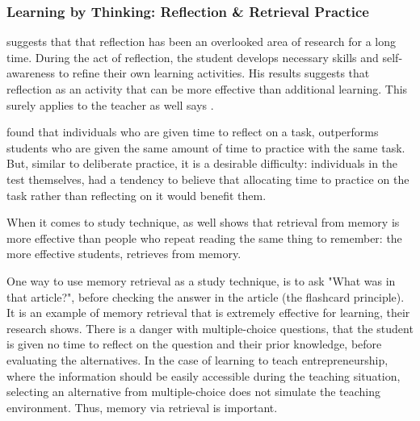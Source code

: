   \subsubsection{Learning by Thinking: Reflection \& Retrieval Practice}

  \cite{stefano} suggests that that reflection has been an overlooked area of research for a long time. During the act of reflection, the student develops necessary skills and self-awareness to refine their own learning activities. His results suggests that reflection as an activity that can be more effective than additional learning. This surely applies to the teacher as well says \cite{luckin}.

  \cite{stefano} found that individuals who are given time to reflect on a task, outperforms students who are given the same amount of time to practice with the same task. But, similar to deliberate practice, it is a desirable difficulty: individuals in the test themselves, had a tendency to believe that allocating time to practice on the task rather than reflecting on it would benefit them.


  When it comes to study technique, \cite{bjork} as well shows that retrieval from memory is more effective than people who repeat reading the same thing to remember: the more effective students, retrieves from memory.

  One way to use memory retrieval as a study technique, is to ask "What was in that article?", before checking the answer in the article (the flashcard principle). It is an example of memory retrieval that is extremely effective for learning, their research shows. There is a danger with multiple-choice questions, that the student is given no time to reflect on the question and their prior knowledge, before evaluating the alternatives. In the case of learning to teach entrepreneurship, where the information should be easily accessible during the teaching situation, selecting an alternative from multiple-choice does not simulate the teaching environment. Thus, memory via retrieval is important.





%
